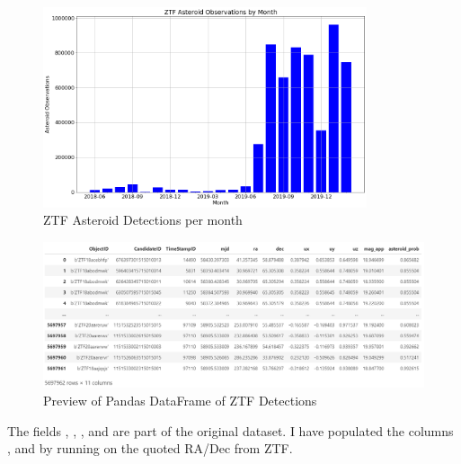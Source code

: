 \begin{figure}[hbt!]
\begin{center}
\includegraphics[width=0.85\textwidth]{../figs/ztf/ztf_ast_per_month.png}
\caption{ZTF Asteroid Detections per month}
\end{center}
\end{figure}

\begin{figure}[hbt!]
\begin{center}
\includegraphics[width=1.0\textwidth]{../figs/ztf/ztf_dataframe.png}
\caption{Preview of Pandas DataFrame of ZTF Detections}
\end{center}
\end{figure}

The fields , , , and  are part of the original dataset.
I have populated the columns ,  and  by running  on the quoted RA/Dec from ZTF.

